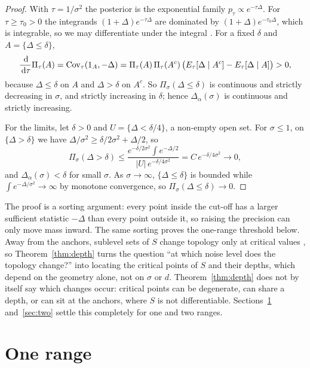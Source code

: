 \begin{proof}
With $\tau = 1/\sigma^2$ the posterior is the exponential family $p_\tau \propto e^{-\tau\Delta}$. For $\tau \ge \tau_0 > 0$
the integrands $(1 + \Delta)e^{-\tau\Delta}$ are dominated by $(1 + \Delta)e^{-\tau_0\Delta}$, which is integrable, so we
may differentiate under the integral \citep[Chapter~2]{brown1986}. For a fixed $\delta$ and $A = \{\Delta \le \delta\}$,
\[ \frac{\,\mathrm{d}}{\,\mathrm{d}\tau}\Pi_\tau(A) = \operatorname{Cov}_\tau(1_A, -\Delta)
   = \Pi_\tau(A)\,\Pi_\tau(A^c)\,\bigl(E_\tau[\Delta \mid A^c] - E_\tau[\Delta \mid A]\bigr) > 0, \]
because $\Delta \le \delta$ on $A$ and $\Delta > \delta$ on $A^c$. So $\Pi_\sigma(\Delta \le \delta)$ is continuous and
strictly decreasing in $\sigma$, and strictly increasing in $\delta$; hence $\Delta_\alpha(\sigma)$ is continuous and
strictly increasing.

For the limits, let $\delta > 0$ and $U = \{\Delta < \delta/4\}$, a non-empty open set. For $\sigma \le 1$,
on $\{\Delta > \delta\}$ we have $\Delta/\sigma^2 \ge \delta/2\sigma^2 + \Delta/2$, so
\[ \Pi_\sigma(\Delta > \delta) \le \frac{e^{-\delta/2\sigma^2}\int e^{-\Delta/2}}{|U|\,e^{-\delta/4\sigma^2}}
   = C\,e^{-\delta/4\sigma^2} \to 0 , \]
and $\Delta_\alpha(\sigma) < \delta$ for small $\sigma$. As $\sigma \to \infty$, $\{\Delta \le \delta\}$ is bounded while
$\int e^{-\Delta/\sigma^2} \to \infty$ by monotone convergence, so $\Pi_\sigma(\Delta \le \delta) \to 0$.
\end{proof}

The proof is a sorting argument: every point inside the cut-off has a larger sufficient statistic $-\Delta$ than every
point outside it, so raising the precision can only move mass inward. The same sorting proves the one-range threshold
below. Away from the anchors, sublevel sets of $S$ change topology only at critical values \citep{milnor1963}, so
Theorem~\ref{thm:depth} turns the question ``at which noise level does the topology change?'' into locating the critical
points of $S$ and their depths, which depend on the geometry alone, not on $\sigma$ or $d$. Theorem~\ref{thm:depth} does
not by itself say which changes occur: critical points can be degenerate, can share a depth, or can sit at the anchors,
where $S$ is not differentiable. Sections~\ref{sec:one} and~\ref{sec:two} settle this completely for one and two ranges.

\section{One range}\label{sec:one}


